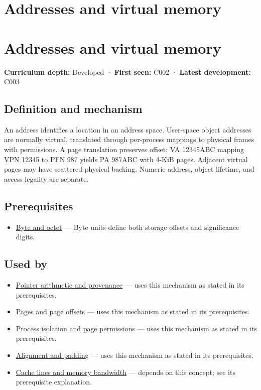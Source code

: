 \hypertarget{appendix-18ee4f913c3c}{}
\section*{Addresses and virtual memory}
\section{Addresses and virtual memory}\label{addresses-and-virtual-memory}

\textbf{Curriculum depth:} Developed · \textbf{First seen:} C002 · \textbf{Latest development:} C003

\subsection{Definition and mechanism}\label{definition-and-mechanism}

An address identifies a location in an address space. User-space object addresses are normally virtual, translated through per-process mappings to physical frames with permissions. A page translation preserves offset; VA 12345ABC mapping VPN 12345 to PFN 987 yields PA 987ABC with 4-KiB pages. Adjacent virtual pages may have scattered physical backing. Numeric address, object lifetime, and access legality are separate.

\subsection{Prerequisites}\label{prerequisites}

\begin{itemize}
\tightlist
\item
  \hyperref[appendix-5bee2df85484]{Byte and octet} --- Byte units define both storage offsets and significance digits.
\end{itemize}

\subsection{Used by}\label{used-by}

\begin{itemize}
\item
  \hyperref[appendix-6af5921bc853]{Pointer arithmetic and provenance} --- uses this mechanism as stated in its prerequisites.
\item
  \hyperref[appendix-0c67cd5bf30a]{Pages and page offsets} --- uses this mechanism as stated in its prerequisites.
\item
  \hyperref[appendix-c2a9ad1e2b49]{Process isolation and page permissions} --- uses this mechanism as stated in its prerequisites.
\item
  \hyperref[appendix-a1f7c53b4742]{Alignment and padding} --- uses this mechanism as stated in its prerequisites.
\item
  \hyperref[appendix-e4ccdbab8320]{Cache lines and memory bandwidth} --- depends on this concept; see its prerequisite explanation.
\end{itemize}

